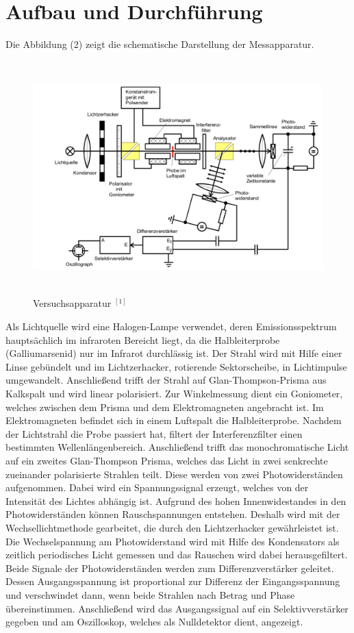 \documentclass{article}
\begin{document}
\section{Aufbau und Durchführung}
Die Abbildung (2) zeigt die schematische Darstellung der Messapparatur.  \\

\begin{figure}[H]
	\centering
	\includegraphics[height=9cm, width=12cm]{aufbau.png}
	\caption{ Versuchsapparatur $^{[1]}$}   
	\label{fig: abb. 1}
\end{figure}
Als Lichtquelle wird eine Halogen-Lampe verwendet, deren Emissionsspektrum hauptsächlich im infraroten Bereicht liegt, da die Halbleiterprobe (Galliumarsenid) nur im Infrarot durchlässig ist. Der Strahl wird mit Hilfe einer Linse gebündelt und im Lichtzerhacker, rotierende Sektorscheibe, in Lichtimpulse umgewandelt. Anschließend trifft der Strahl auf Glan-Thompson-Prisma aus Kalkspalt und wird linear polarisiert. Zur Winkelmessung dient ein Goniometer, welches zwischen dem Prisma und dem Elektromagneten angebracht ist. Im Elektromagneten befindet sich in einem Luftspalt die Halbleiterprobe. Nachdem der Lichtstrahl die Probe passiert hat, filtert der Interferenzfilter einen bestimmten Wellenlängenbereich. Anschließend trifft das monochromatische Licht auf ein zweites Glan-Thompson Prisma, welches das Licht in zwei senkrechte zueinander polarisierte Strahlen teilt. Diese werden von zwei Photowiderständen aufgenommen. Dabei wird ein Spannungssignal erzeugt, welches von der Intensität des Lichtes abhängig ist. Aufgrund des hohen Innenwidestandes in den Photowiderständen können Rauschspannungen entstehen. Deshalb wird mit der  Wechsellichtmethode gearbeitet, die durch den Lichtzerhacker gewährleistet ist. Die Wechselspannung am Photowiderstand wird mit Hilfe des Kondensators als zeitlich periodisches Licht gemessen und das Rauschen wird dabei herausgefiltert. Beide Signale der Photowiderständen werden zum Differenzverstärker geleitet. Dessen Ausgangsspannung ist proportional zur Differenz der Eingangsspannung und verschwindet dann, wenn beide Strahlen nach Betrag und Phase übereinstimmen. Anschließend wird das Ausgangssignal auf ein Selektivverstärker gegeben und am Oszilloskop, welches als Nulldetektor dient, angezeigt.\\\\
\end{document}
